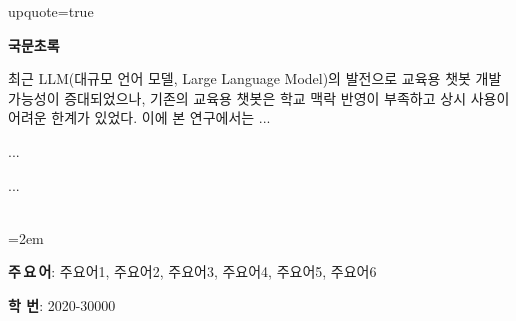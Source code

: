 \documentclass[12pt]{report}
\makeatletter
\renewcommand{\abstractname}{\large 국문초록} %
\renewenvironment{abstract}{%
    \if@twocolumn
    \section*{\abstractname}%
    \else
    \small
    \begin{center}%
        {\bfseries \abstractname\vspace{-.5em}\vspace{\z@}}%
    \end{center}%
    \quotation
    \fi}
{\if@twocolumn\else\endquotation\fi}
\renewenvironment{abstract}
 {\small
  \begin{center}
  \bfseries \abstractname\vspace{-.5em}\vspace{0pt}
  \end{center}
  \list{}{%
    \setlength{\leftmargin}{10mm}%
    \setlength{\rightmargin}{\leftmargin}%
  }%
  \item\relax}
 {\endlist}
\makeatother
\begin{document}
{%
    upquote=true
}

\lstset{style=python}

\cleardoublepage %
\begin{abstract}

\quad 최근 LLM(대규모 언어 모델, Large Language Model)의 발전으로 교육용 챗봇 개발 가능성이 증대되었으나, 기존의 교육용 챗봇은 학교 맥락 반영이 부족하고 상시 사용이 어려운 한계가 있었다. 이에 본 연구에서는 ...

\quad ...

\quad ...

~\\
\hangindent=2em

\textbf{주\,요\,어}: 주요어1, 주요어2, 주요어3, 주요어4, 주요어5, 주요어6

\noindent \textbf{학 \quad 번}: 2020-30000
~\\
\end{abstract}
\end{document}
